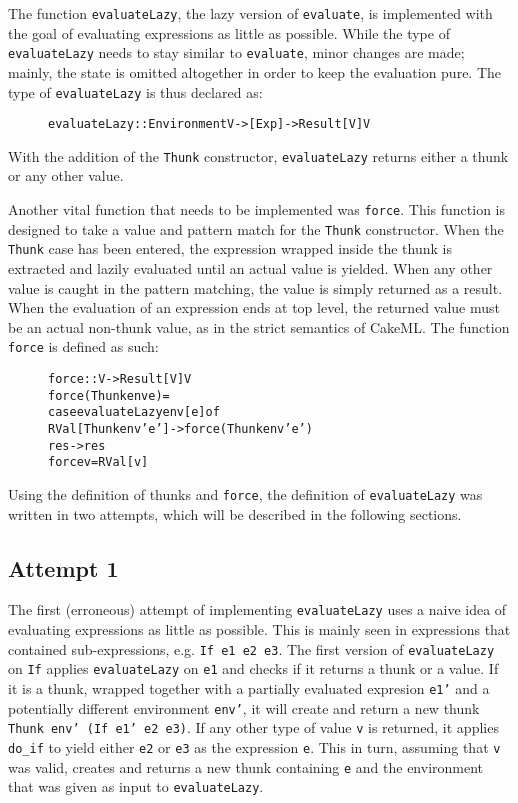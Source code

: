 The function \texttt{evaluateLazy}, the lazy version of \texttt{evaluate}, is
implemented with the goal of evaluating expressions as little as possible. While
the type of \texttt{evaluateLazy} needs to stay similar to
\texttt{evaluate}, minor changes are made; mainly, the state is omitted
altogether in order to keep the evaluation pure. The type of
\texttt{evaluateLazy} is thus declared as:

\begin{figure}[H]
\begin{alltt}
  evaluateLazy :: Environment V -> [Exp] -> Result [V] V
\end{alltt}
\end{figure}

\noindent With the addition of the \texttt{Thunk} constructor, \texttt{evaluateLazy}
returns either a thunk or any other value.

Another vital function that needs to be implemented was \texttt{force}.
This function is designed to take a value and pattern match for the
\texttt{Thunk} constructor. When the \texttt{Thunk} case has been entered,
the expression wrapped inside the thunk is extracted and lazily evaluated until
an actual value is yielded. When any other value is caught in the pattern matching,
the value is simply returned as a result.
When the evaluation of an expression ends at top level, the returned value
must be an actual non-thunk value, as in the strict semantics of CakeML.
The function \texttt{force} is defined as such:

\begin{figure}[H]
\begin{alltt}
  force :: V -> Result [V] V
  force (Thunk env e) =
    case evaluateLazy env [e] of
      RVal [Thunk env' e'] -> force (Thunk env' e')
      res -> res
  force v = RVal [v]
\end{alltt}
\end{figure}

Using the definition of thunks and \texttt{force}, the definition of
\texttt{evaluateLazy} was written in two attempts, which
will be described in the following sections.

\subsection{Attempt 1}
The first (erroneous) attempt of implementing \texttt{evaluateLazy} uses a naive
idea of evaluating expressions as little as possible. This is mainly seen in
expressions that contained sub-expressions, e.g. \texttt{If e1 e2 e3}. The first
version of \texttt{evaluateLazy} on \texttt{If} applies
\texttt{evaluateLazy} on \texttt{e1} and checks if it returns a thunk or a
value. If it is a thunk, wrapped together with a partially evaluated expresion
\texttt{e1'} and a potentially different environment \texttt{env'}, it will
create and return a new thunk \texttt{Thunk env' (If e1' e2 e3)}. If any other
type of value \texttt{v} is returned, it applies \texttt{do\_if} to yield either
\texttt{e2} or \texttt{e3} as the expression \texttt{e}. This in turn,
assuming that \texttt{v} was valid, creates and returns a new thunk containing
\texttt{e} and the environment that was given as input to \texttt{evaluateLazy}.

